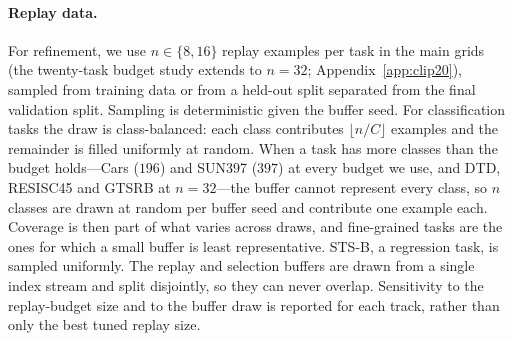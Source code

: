 \documentclass{article} %
\begin{document}
\paragraph{Replay data.}
For refinement, we use $n \in \{8,16\}$ replay examples per task in the main grids (the twenty-task budget study extends to $n=32$; Appendix~\ref{app:clip20}), sampled from training data or from a held-out split separated from the final validation split. Sampling is deterministic given the buffer seed. For classification tasks the draw is class-balanced: each class contributes $\lfloor n/C\rfloor$ examples and the remainder is filled uniformly at random. When a task has more classes than the budget holds---Cars ($196$) and SUN397 ($397$) at every budget we use, and DTD, RESISC45 and GTSRB at $n=32$---the buffer cannot represent every class, so $n$ classes are drawn at random per buffer seed and contribute one example each. Coverage is then part of what varies across draws, and fine-grained tasks are the ones for which a small buffer is least representative. STS-B, a regression task, is sampled uniformly. The replay and selection buffers are drawn from a single index stream and split disjointly, so they can never overlap. Sensitivity to the replay-budget size and to the buffer draw is reported for each track, rather than only the best tuned replay size.
\end{document}
